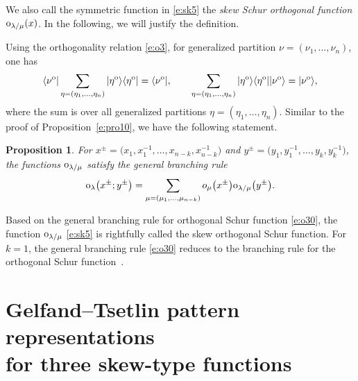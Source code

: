 \documentclass[10pt,a4paper]{amsart}
\numberwithin{equation}{section}
\newtheorem{Proposition}[Theorem]{Proposition}
 { \theoremstyle{definition}
\newtheorem{Definition}[Theorem]{Definition}
\newtheorem{Note}[Theorem]{Note}
\newtheorem{Example}[Theorem]{Example}
\newtheorem{Remark}[Theorem]{Remark} }
\begin{document}
We also call the symmetric function in \eqref{e:sk5} the {\it skew Schur orthogonal function} ${\rm o}_{\lambda/\mu}(x)$. In the following, we will justify the definition.

Using the orthogonality relation \eqref{e:o3}, for generalized partition $\nu=(\nu_1,\dots,\nu_n)$, one has
\begin{align}
\label{e:o24}\langle\nu^{\rm o}|\sum_{\eta=(\eta_1,\dots,\eta_n)}|\eta^{\rm o}\rangle\langle\eta^{\rm o}| = \langle\nu^{\rm o}|,\qquad \sum_{\eta=(\eta_1,\dots,\eta_n)}|\eta^{\rm o}\rangle\langle\eta^{\rm o}||\nu^{\rm o}\rangle = |\nu^{\rm o}\rangle,
\end{align}
where the sum is over all generalized partitions $\eta=(\eta_1,\dots,\eta_n)$. Similar to the proof of Proposition~\ref{e:pro10}, we have the following statement.


\begin{Proposition}For $x^{\pm}=\big(x_1,x^{-1}_1,\dots,x_{n-k},x^{-1}_{n-k}\big)$ and $y^{\pm}=\big(y_1,y^{-1}_1,\dots,y_{k},y^{-1}_{k}\big)$, the functions ${\rm o}_{\lambda/\mu}$ satisfy the general branching rule
\begin{align}\label{e:o30}
{\rm o}_\lambda\big(x^{\pm};y^{\pm}\big)=\sum_{\mu=(\mu_1,\dots,\mu_{n-k})}o_\mu\big(x^{\pm}\big){\rm o}_{\lambda/\mu}\big(y^{\pm}\big).
\end{align}
\end{Proposition}

\begin{Remark}
Based on the general branching rule for orthogonal Schur function \eqref{e:o30}, the function ${\rm o}_{\lambda/\mu}$ \eqref{e:sk5} is rightfully called the skew orthogonal Schur function. For $k=1$, the general branching rule \eqref{e:o30} reduces to the branching rule for the orthogonal Schur function~\mbox{\cite[Theorem 3.2]{KT1990}}.
\end{Remark}

\section[Gelfand--Tsetlin pattern representations for three skew-type functions]{Gelfand--Tsetlin pattern representations\\ for three skew-type functions}\label{s4}
\end{document}
